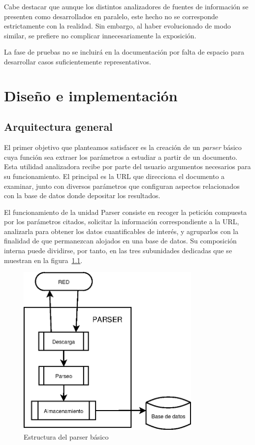 Cabe destacar que aunque los distintos analizadores de fuentes de información
se presenten como desarrollados en paralelo, este hecho no se corresponde
estrictamente con la realidad. Sin embargo, al haber evolucionado de modo
similar, se prefiere no complicar innecesariamente la exposición.

La fase de pruebas no se incluirá en la documentación por falta de espacio
para desarrollar casos suficientemente representativos.




\newpage
\chapter{Diseño e implementación}

\section{Arquitectura general} 
\label{arquitectura}

El primer objetivo que planteamos satisfacer es la creación de un \textit{parser}
básico cuya función sea extraer los parámetros a estudiar a partir de un documento.
Esta utilidad analizadora recibe por parte del usuario argumentos necesarios
para su funcionamiento. El principal es la URL que direcciona el documento a
examinar, junto con diversos parámetros que configuran aspectos relacionados
con la base de datos donde depositar los resultados.

El funcionamiento de la unidad Parser consiste en recoger la petición compuesta
por los parámetros citados, solicitar la información correspondiente a la URL,
analizarla para obtener los datos cuantificables de interés, y agruparlos con la
finalidad de que permanezcan alojados en una base de datos.
Su composición interna puede dividirse, por tanto, en las tres subunidades
dedicadas que se muestran en la figura~\ref{figura:arquitectura}.

\begin{figure}[H]
  \centering
  \includegraphics[width=9cm, keepaspectratio]{img/arquitectura}
  \caption{Estructura del parser básico}
  \label{figura:arquitectura}
\end{figure}

